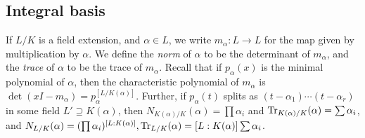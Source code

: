 \subsection{Integral basis}
If \( L / K \) is a field extension, and \( \alpha \in L \), we write \( m_\alpha \colon L \to L \) for the map given by multiplication by \( \alpha \).
We define the \emph{norm} of \( \alpha \) to be the determinant of \( m_\alpha \), and the \emph{trace} of \( \alpha \) to be the trace of \( m_\alpha \).
Recall that if \( p_\alpha(x) \) is the minimal polynomial of \( \alpha \), then the characteristic polynomial of \( m_\alpha \) is \( \det(xI - m_\alpha) = p_\alpha^{[L/K(\alpha)]} \).
Further, if \( p_\alpha(t) \) splits as \( (t-\alpha_1)\cdots(t-\alpha_r) \) in some field \( L' \supseteq K(\alpha) \), then \( N_{K(\alpha)/K}(\alpha) = \prod \alpha_i \) and \( \Tr_{K(\alpha)/K}(\alpha) = \sum \alpha_i \), and \( N_{L/K}(\alpha) = (\prod \alpha_i)^{[L:K(\alpha)]}, \Tr_{L/K}(\alpha) = [L:K(\alpha)] \sum \alpha_i \).

